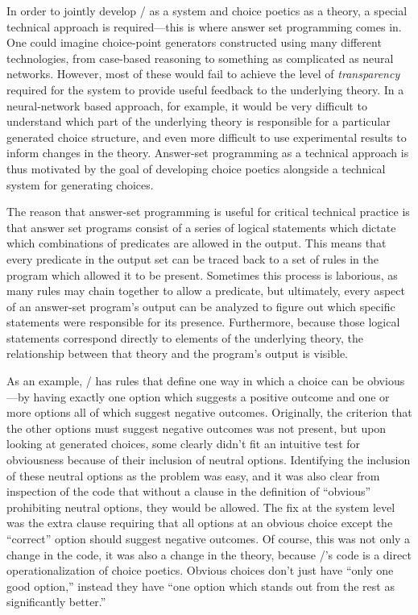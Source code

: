 In order to jointly develop \dunyazad/ as a system and choice poetics as a theory, a special technical approach is required---this is where answer set programming comes in.
%
One could imagine choice-point generators constructed using many different technologies, from case-based reasoning to something as complicated as neural networks.
%
However, most of these would fail to achieve the level of \emph{transparency} required for the system to provide useful feedback to the underlying theory.
%
In a neural-network based approach, for example, it would be very difficult to understand which part of the underlying theory is responsible for a particular generated choice structure, and even more difficult to use experimental results to inform changes in the theory.
%
Answer-set programming as a technical approach is thus motivated by the goal of developing choice poetics alongside a technical system for generating choices.


The reason that answer-set programming is useful for critical technical practice is that answer set programs consist of a series of logical statements which dictate which combinations of predicates are allowed in the output.
%
This means that every predicate in the output set can be traced back to a set of rules in the program which allowed it to be present.
%
Sometimes this process is laborious, as many rules may chain together to allow a predicate, but  ultimately, every aspect of an answer-set program's output can be analyzed to figure out which specific statements were responsible for its presence.
%
Furthermore, because those logical statements correspond directly to elements of the underlying theory, the relationship between that theory and the program's output is visible.

As an example, \dunyazad/ has rules that define one way in which a choice can be obvious---by having exactly one option which suggests a positive outcome and one or more options all of which suggest negative outcomes.
%
Originally, the criterion that the other options must suggest negative outcomes was not present, but upon looking at generated choices, some clearly didn't fit an intuitive test for obviousness because of their inclusion of neutral options.
%
Identifying the inclusion of these neutral options as the problem was easy, and it was also clear from inspection of the code that without a clause in the definition of ``obvious'' prohibiting neutral options, they would be allowed.
%
The fix at the system level was the extra clause requiring that all options at an obvious choice except the ``correct'' option should suggest negative outcomes.
%
Of course, this was not only a change in the code, it was also a change in the theory, because \dunyazad/'s code is a direct operationalization of choice poetics.
%
Obvious choices don't just have ``only one good option,'' instead they have ``one option which stands out from the rest as significantly better.''


